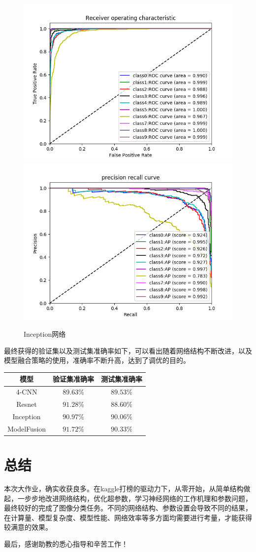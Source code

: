 \documentclass[UTF8]{ctexart}
\begin{document}
\begin{figure}[H]
    \centering
    \includegraphics[scale=0.35]{../images/inceproc.png}
    \includegraphics[scale=0.35]{../images/inceppro.png}
    \caption{Inception网络}
\end{figure}

最终获得的验证集以及测试集准确率如下，可以看出随着网络结构不断改进，以及模型融合策略的使用，准确率不断升高，达到了调优的目的。

\begin{table}[H]
\centering
\begin{tabular}{ccc}
    \hline
    模型& 验证集准确率& 测试集准确率\\
    \hline
    4-CNN & $89.63\%$ &$89.53\%$\\
    Resnet & $91.28\%$&$88.60\%$\\
    Inception &$90.97\%$ & $90.06\%$\\
    ModelFusion &$91.72\%$&$90.33\%$\\
    \hline
\end{tabular}
\end{table}

\section{总结}

本次大作业，确实收获良多。在kaggle打榜的驱动力下，从零开始，从简单结构做起，一步步地改进网络结构，优化超参数，学习神经网络的工作机理和参数问题，最终较好的完成了图像分类任务。不同的网络结构、参数设置会导致不同的结果，在计算量、模型复杂度、模型性能、网络效率等多方面均需要进行考量，才能获得较满意的效果。

最后，感谢助教的悉心指导和辛苦工作！
\end{document}
